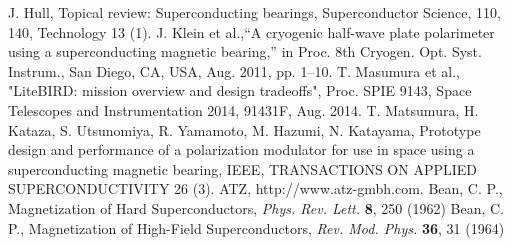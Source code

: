 \documentclass[journal]{IEEEtran}
\begin{document}
%
%
%
\begin{thebibliography}{99}

J. Hull, Topical review: Superconducting bearings, Superconductor Science, 110, 140, Technology 13 (1).
J. Klein et al.,“A cryogenic half-wave plate polarimeter using a superconducting magnetic bearing,” in Proc. 8th Cryogen. Opt. Syst. Instrum., San Diego, CA, USA, Aug. 2011, pp. 1–10.
T. Masumura et al., "LiteBIRD: mission overview and design tradeoffs", Proc. SPIE 9143, Space Telescopes and Instrumentation 2014, 91431F, Aug. 2014.
T. Matsumura, H. Kataza, S. Utsunomiya, R. Yamamoto, M. Hazumi, N. Katayama, Prototype design and performance of a polarization modulator for use in space using a superconducting magnetic bearing, IEEE, TRANSACTIONS ON APPLIED SUPERCONDUCTIVITY 26 (3).
ATZ, http://www.atz-gmbh.com.
Bean, C. P., Magnetization of Hard Superconductors, {\em Phys. Rev. Lett.\/} {\bf 8}, 250 (1962)
Bean, C. P., Magnetization of High-Field Superconductors, {\em Rev. Mod. Phys.\/} {\bf 36}, 31 (1964)
\end{thebibliography}

%






\end{document}
